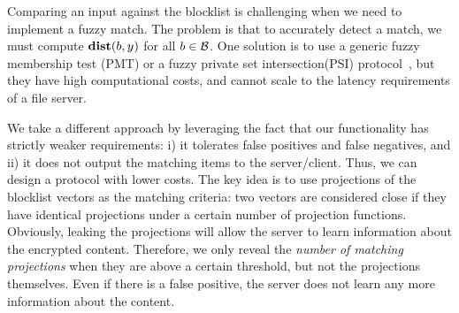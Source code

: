 



%
Comparing an input against the blocklist is challenging when we need to implement a fuzzy match. The problem is that to accurately detect a match, we must compute $\distanceNotation[\distance][\genericBlocklistElmt][\genericCInputElmt]$ for all $\genericBlocklistElmt \in \blocklist$. One solution is to use a generic fuzzy membership test (PMT) or a fuzzy private set intersection(PSI) protocol~\cite{piske2025distance,garimella2022structure,van2024fuzzy}, but they have high computational costs, and cannot scale to the latency requirements of a file server. 

We take a different approach by leveraging the fact that our functionality has strictly weaker requirements: i) it tolerates false positives and false negatives, and ii) it does not output the matching items to the server/client. Thus, we can design a protocol with lower costs. The key idea is to use projections of the blocklist vectors as the matching criteria: two vectors are considered close if they have identical projections under a certain number of projection functions. Obviously, leaking the projections will allow the server to learn information about the encrypted content. Therefore, we only reveal the \emph{number of matching projections} when they are above a certain threshold, but not the projections themselves. Even if there is a false positive, the server does not learn any more information about the content.

